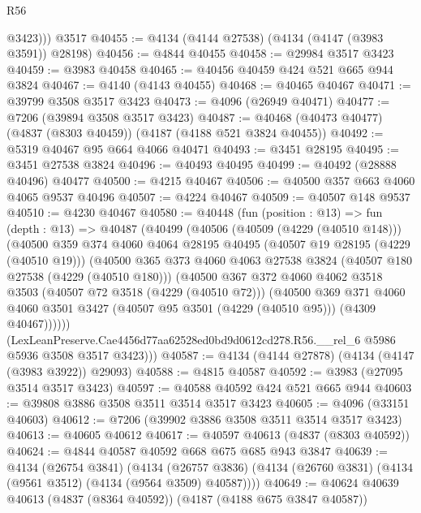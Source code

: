 \begin{lexlean}{R56}
\begin{coremodule}
          @3423)))
    @3517
@40455 := @4134 (@4144 @27538) (@4134 (@4147 (@3983 @3591)) @28198)
@40456 := @4844 @40455
@40458 := @29984 @3517 @3423
@40459 := @3983 @40458
@40465 := @40456 @40459 @424 @521 @665 @944 @3824
@40467 := @4140 (@4143 @40455)
@40468 := @40465 @40467
@40471 := @39799 @3508 @3517 @3423
@40473 := @4096 (@26949 @40471)
@40477 := @7206 (@39894 @3508 @3517 @3423)
@40487 := @40468 (@40473 @40477) (@4837 (@8303 @40459)) (@4187 (@4188 @521 @3824 @40455))
@40492 := @5319 @40467 @95 @664 @4066 @40471
@40493 := @3451 @28195
@40495 := @3451 @27538 @3824
@40496 := @40493 @40495
@40499 := @40492 (@28888 @40496) @40477
@40500 := @4215 @40467
@40506 := @40500 @357 @663 @4060 @4065 @9537 @40496
@40507 := @4224 @40467
@40509 := @40507 @148 @9537
@40510 := @4230 @40467
@40580 := @40448
    (fun (position : @13) =>
    fun (depth : @13) =>
    @40487
      (@40499
        (@40506
          (@40509 (@4229 (@40510 @148)))
          (@40500
            @359
            @374
            @4060
            @4064
            @28195
            @40495
            (@40507 @19 @28195 (@4229 (@40510 @19)))
            (@40500
              @365
              @373
              @4060
              @4063
              @27538
              @3824
              (@40507 @180 @27538 (@4229 (@40510 @180)))
              (@40500
                @367
                @372
                @4060
                @4062
                @3518
                @3503
                (@40507 @72 @3518 (@4229 (@40510 @72)))
                (@40500
                  @369
                  @371
                  @4060
                  @4060
                  @3501
                  @3427
                  (@40507 @95 @3501 (@4229 (@40510 @95)))
                  (@4309 @40467))))))
        (LexLeanPreserve.Cae4456d77aa62528ed0bd9d0612cd278.R56.__rel_6
          @5986
          @5936
          @3508
          @3517
          @3423)))
@40587 := @4134 (@4144 @27878) (@4134 (@4147 (@3983 @3922)) @29093)
@40588 := @4815 @40587
@40592 := @3983 (@27095 @3514 @3517 @3423)
@40597 := @40588 @40592 @424 @521 @665 @944
@40603 := @39808 @3886 @3508 @3511 @3514 @3517 @3423
@40605 := @4096 (@33151 @40603)
@40612 := @7206 (@39902 @3886 @3508 @3511 @3514 @3517 @3423)
@40613 := @40605 @40612
@40617 := @40597 @40613 (@4837 (@8303 @40592))
@40624 := @4844 @40587 @40592 @668 @675 @685 @943 @3847
@40639 := @4134
    (@26754 @3841)
    (@4134 (@26757 @3836) (@4134 (@26760 @3831) (@4134 (@9561 @3512) (@4134 (@9564 @3509) @40587))))
@40649 := @40624 @40639 @40613 (@4837 (@8364 @40592)) (@4187 (@4188 @675 @3847 @40587))

\end{coremodule}
\end{lexlean}
